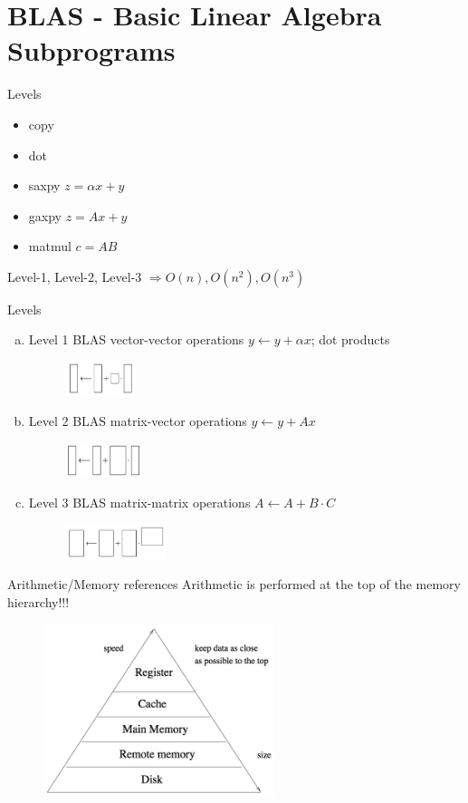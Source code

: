 \section{BLAS - Basic Linear Algebra Subprograms}
	\begin{frame}{Levels}
		\begin{itemize}
			\item copy
			\item dot
			\item saxpy \quad $ z = \alpha x + y$
			\item gaxpy \quad $z = Ax + y$
			\item matmul \quad  $c = AB$
		\end{itemize}
		Level-1, Level-2, Level-3 $ \Rightarrow O(n), O(n^2), O(n^3)$
	\end{frame}
	\begin{frame}{Levels}
		\begin{enumerate}[a)]
			\item Level 1 BLAS vector-vector operations
			$y \leftarrow y + \alpha x$; dot products
			\begin{figure}
				\includegraphics[height=1cm]{img/13/level1}
			\end{figure}
			\item Level 2 BLAS matrix-vector operations
			$y \leftarrow y + Ax$
			\begin{figure}
				\includegraphics[height=1cm]{img/13/level2}
			\end{figure}
			\item Level 3 BLAS matrix-matrix operations
			$A \leftarrow A + B \cdot C$
			\begin{figure}
				\includegraphics[height=1cm]{img/13/level3}
			\end{figure}
		\end{enumerate}
	\end{frame}
	\begin{frame}{Arithmetic/Memory references}
		Arithmetic is performed at the top of the memory hierarchy!!!
		\begin{figure}
			\includegraphics[height=5cm]{img/13/arithmeticmemref}
		\end{figure}
	\end{frame}
